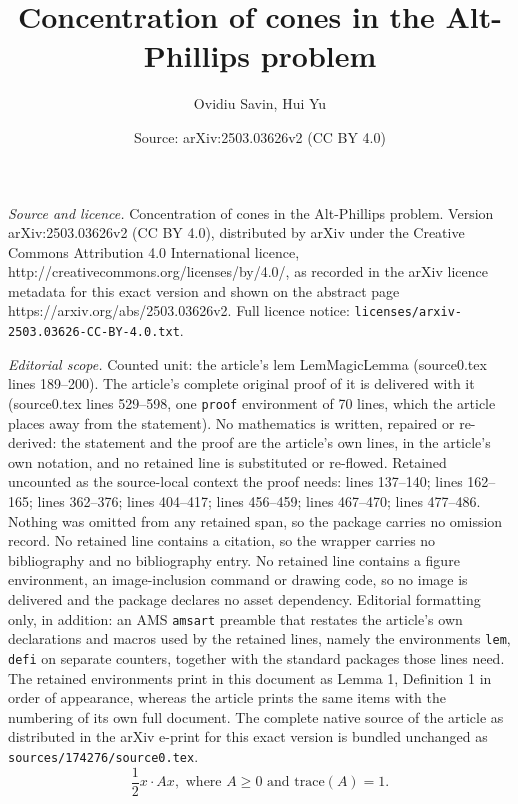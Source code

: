 \documentclass[10pt,a4paper]{amsart}
\title{Concentration of cones in the Alt-Phillips problem}
\author{Ovidiu Savin, Hui Yu}
\date{Source: arXiv:2503.03626v2 (CC BY 4.0)}
\begin{document}
\maketitle

\noindent\emph{Source and licence.} Concentration of cones in the Alt-Phillips problem. Version arXiv:2503.03626v2 (CC BY 4.0), distributed by arXiv under the Creative Commons Attribution 4.0 International licence, http://creativecommons.org/licenses/by/4.0/, as recorded in the arXiv licence metadata for this exact version and shown on the abstract page https://arxiv.org/abs/2503.03626v2. Full licence notice: \texttt{licenses/arxiv-2503.03626-CC-BY-4.0.txt}.\par\smallskip

\noindent\textit{Editorial scope.} Counted unit: the article's lem LemMagicLemma (source0.tex lines 189--200). The article's complete original proof of it is delivered with it (source0.tex lines 529--598, one \texttt{proof} environment of 70 lines, which the article places away from the statement). No mathematics is written, repaired or re-derived: the statement and the proof are the article's own lines, in the article's own notation, and no retained line is substituted or re-flowed.  Retained uncounted as the source-local context the proof needs: lines 137--140; lines 162--165; lines 362--376; lines 404--417; lines 456--459; lines 467--470; lines 477--486.  Nothing was omitted from any retained span, so the package carries no omission record.  No retained line contains a citation, so the wrapper carries no bibliography and no bibliography entry.  No retained line contains a figure environment, an image-inclusion command or drawing code, so no image is delivered and the package declares no asset dependency.  Editorial formatting only, in addition: an AMS \texttt{amsart} preamble that restates the article's own declarations and macros used by the retained lines, namely the environments \texttt{lem}, \texttt{defi} on separate counters, together with the standard packages those lines need.  The retained environments print in this document as Lemma 1, Definition 1 in order of appearance, whereas the article prints the same items with the numbering of its own full document.  The complete native source of the article as distributed in the arXiv e-print for this exact version is bundled unchanged as \texttt{sources/174276/source0.tex}.
\begin{equation}
\label{EqnParabolaSolutions}
\frac12x\cdot Ax, \text{ where  }A\ge0 \text{ and }\mathrm{trace}(A)=1.
\end{equation}
\end{document}
